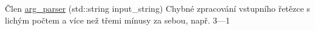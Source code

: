 
\begin{DoxyRefList}
\item[Člen \mbox{\hyperlink{arguments__parser_8h_a6c4e1a0f2d45b6174adfab4f3184155c}{arg\+\_\+parser}} (std\+::string input\+\_\+string)]\label{bug__bug000001}%
%
Chybné zpracování vstupního řetězce s lichým počtem a více než třemi mínusy za sebou, např. 3---1 
\end{DoxyRefList}